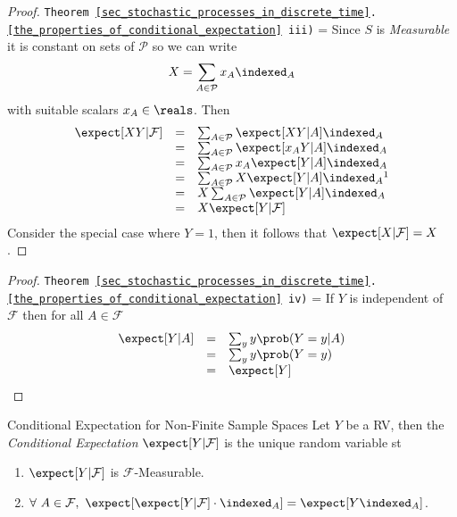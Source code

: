 \documentclass[11pt,a4paper]{article}
\begin{document}
  \begin{proof}{\texttt{Theorem \ref{sec_stochastic_processes_in_discrete_time}.\ref{the_properties_of_conditional_expectation} iii)}}\label{proof_conditional_expectation_property_iii}
    \everymath={\displaystyle}
    Since $S$ is \textit{Measurable} it is constant on sets of $\mathcal{P}$ so we can write
    \[ X=\sum_{A\in\mathcal{P}} x_A\indexed_A \]
    with suitable scalars $x_A\in\reals$. Then
    \[\begin{array}{rcl}
      \expect[XY|\mathcal{F}]&=&\sum_{A\in\mathcal{P}}\expect[XY|A]\indexed_A\\
      &=&\sum_{A\in\mathcal{P}}\expect[x_AY|A]\indexed_A\\
      &=&\sum_{A\in\mathcal{P}}x_A\expect[Y|A]\indexed_A\\
      &=&\sum_{A\in\mathcal{P}}X\expect[Y|A]\indexed_A\footnotemark\\
      &=&X\sum_{A\in\mathcal{P}}\expect[Y|A]\indexed_A\\
      &=&X\expect[Y|\mathcal{F}]
    \end{array}\]
    Consider the special case where $Y=1$, then it follows that $\expect[X|\mathcal{F}]=X$.\proved
  \end{proof}

  \begin{proof}{\texttt{Theorem \ref{sec_stochastic_processes_in_discrete_time}.\ref{the_properties_of_conditional_expectation} iv)}}
    \everymath={\displaystyle}
    If $Y$ is independent of $\mathcal{F}$ then for all $A\in\mathcal{F}$
    \[\begin{array}{rcl}
      \expect[Y|A]&=&\sum_yy\prob(Y=y|A)\\
      &=&\sum_yy\prob(Y=y)\\
      &=&\expect[Y]
    \end{array}\]
    \proved
  \end{proof}

  \begin{proposition}{Conditional Expectation for Non-Finite Sample Spaces}\label{prop_conditional_expectation_for_non_finite_sample_space}
    Let $Y$ be a RV, then the \textit{Conditional Expectation} $\expect[Y|\mathcal{F}]$ is the unique random variable st
    \begin{enumerate}
      \item $\expect[Y|\mathcal{F}]$ is $\mathcal{F}$-Measurable.
      \item $\forall\ A\in\mathcal{F},\ \expect[\expect[Y|\mathcal{F}]\cdot\indexed_A]=\expect[Y\indexed_A]$.
    \end{enumerate}
  \end{proposition}
\end{document}
